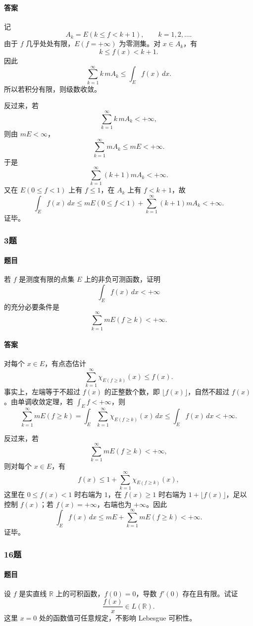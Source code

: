 \documentclass{article}
\begin{document}
\paragraph{答案} 记
\[
 A_k=E(k\le f<k+1),\qquad k=1,2,\ldots.
\]
由于 $f$ 几乎处处有限，$E(f=+\infty)$ 为零测集。对 $x\in A_k$，有
\[
 k\le f(x)<k+1.
\]
因此
\[
 \sum_{k=1}^{\infty} k\,mA_k
\le \int_E f(x)\,dx.
\]
所以若积分有限，则级数收敛。

反过来，若
\[
 \sum_{k=1}^{\infty} k\,mA_k<+\infty,
\]
则由 $mE<\infty$，
\[
 \sum_{k=1}^{\infty}mA_k\le mE<+\infty.
\]
于是
\[
 \sum_{k=1}^{\infty}(k+1)mA_k<+\infty.
\]
又在 $E(0\le f<1)$ 上有 $f\le1$，在 $A_k$ 上有 $f<k+1$，故
\[
 \int_E f(x)\,dx
\le mE(0\le f<1)+\sum_{k=1}^{\infty}(k+1)mA_k<+\infty.
\]
证毕。

\subsubsection*{3题}
\paragraph{题目} 若 $f$ 是测度有限的点集 $E$ 上的非负可测函数，证明
\[
 \int_E f(x)\,dx<+\infty
\]
的充分必要条件是
\[
 \sum_{k=1}^{\infty}mE(f\ge k)<+\infty.
\]

\paragraph{答案} 对每个 $x\in E$，有点态估计
\[
 \sum_{k=1}^{\infty}\chi_{E(f\ge k)}(x)\le f(x).
\]
事实上，左端等于不超过 $f(x)$ 的正整数个数，即 $\lfloor f(x)\rfloor$，自然不超过 $f(x)$。由单调收敛定理，若 $\int_E f<+\infty$，则
\[
 \sum_{k=1}^{\infty}mE(f\ge k)
=\int_E\sum_{k=1}^{\infty}\chi_{E(f\ge k)}(x)\,dx
\le \int_E f(x)\,dx<+\infty.
\]

反过来，若
\[
 \sum_{k=1}^{\infty}mE(f\ge k)<+\infty,
\]
则对每个 $x\in E$，有
\[
 f(x)\le 1+\sum_{k=1}^{\infty}\chi_{E(f\ge k)}(x),
\]
这里在 $0\le f(x)<1$ 时右端为 $1$，在 $f(x)\ge1$ 时右端为 $1+\lfloor f(x)\rfloor$，足以控制 $f(x)$；若 $f(x)=+\infty$，右端也为 $+\infty$。因此
\[
 \int_E f(x)\,dx
\le mE+\sum_{k=1}^{\infty}mE(f\ge k)<+\infty.
\]
证毕。


\subsubsection*{16题}
\paragraph{题目} 设 $f$ 是实直线 $\mathbb{R}$ 上的可积函数，$f(0)=0$，导数 $f'(0)$ 存在且有限。试证
\[
 \frac{f(x)}{x}\in L(\mathbb{R}).
\]
这里 $x=0$ 处的函数值可任意规定，不影响 Lebesgue 可积性。
\end{document}
